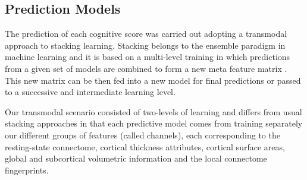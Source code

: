 \documentclass[10pt,letterpaper]{article}
\begin{document}
\subsection*{Prediction Models}

The prediction of each cognitive score was carried out adopting a transmodal approach to stacking learning. Stacking belongs to the ensemble paradigm in machine learning and it is based on a multi-level training in which predictions from a given set of models are combined to form a new meta feature matrix \cite{WOLPERT1992241, Rahim2016}. This new matrix can be then fed into a new model for final predictions or passed to a successive and intermediate learning level.

Our transmodal scenario consisted of two-levels of learning and differs from usual stacking approaches in that each predictive model comes from training separately our different groups of features (called channels), each corresponding to the resting-state connectome, cortical thickness attributes, cortical surface areas, global and subcortical volumetric information and the local connectome fingerprints.
\end{document}
